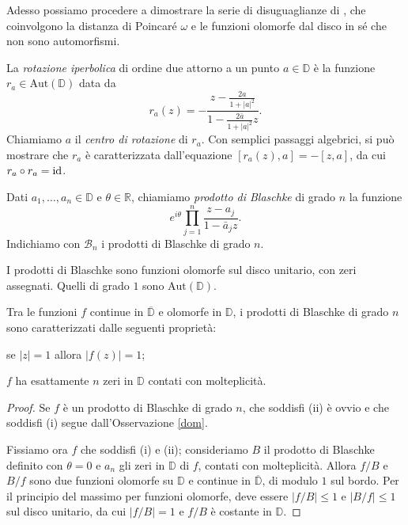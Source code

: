Adesso possiamo procedere a dimostrare la serie di disuguaglianze di \cite{BM}, che coinvolgono la distanza di Poincaré $\omega$ e le funzioni olomorfe dal disco in sé che non sono automorfismi.

\begin{defn}
  La \textit{rotazione iperbolica} di ordine due attorno a un punto $a \in \mathbb{D}$ è la funzione $r_a \in \text{Aut}(\mathbb{D})$ data da
  $$r_a(z)=-\frac{z-\frac{2a}{1+|a|^2}}{1-\frac{2\bar{a}}{1+|a|^2}z}.$$
  Chiamiamo $a$ il \textit{centro di rotazione} di $r_a$. Con semplici passaggi algebrici, si può mostrare che $r_a$ è caratterizzata dall'equazione $[r_a(z),a]=-[z,a]$, da cui $r_a\circ r_a=\operatorname{id}$.
\end{defn}

\begin{defn}
  Dati $a_1,\dots,a_n \in \mathbb{D}$ e $\theta \in \mathbb{R}$, chiamiamo \textit{prodotto di Blaschke} di grado $n$ la funzione
  $$e^{i\theta}\prod_{j=1}^n \frac{z-a_j}{1-\bar{a}_jz}.$$
  Indichiamo con $\mathcal{B}_n$ i prodotti di Blaschke di grado $n$.
\end{defn}

\begin{oss}
  I prodotti di Blaschke sono funzioni olomorfe sul disco unitario, con zeri assegnati. Quelli di grado $1$ sono $\text{Aut}(\mathbb{D})$.
\end{oss}

\begin{lm} \label{Blaschke-car}
  Tra le funzioni $f$ continue in $\overline{\mathbb{D}}$ e olomorfe in $\mathbb{D}$, i prodotti di Blaschke di grado $n$ sono caratterizzati dalle seguenti proprietà:
  \begin{nlist}
    \item se $|z|=1$ allora $|f(z)|=1$;
    \item $f$ ha esattamente $n$ zeri in $\mathbb{D}$ contati con molteplicità.
  \end{nlist}
\end{lm}

\begin{proof}
  Se $f$ è un prodotto di Blaschke di grado $n$, che soddisfi (ii) è ovvio e che soddisfi (i) segue dall'Osservazione \ref{dom}.

  Fissiamo ora $f$ che soddisfi (i) e (ii); consideriamo $B$ il prodotto di Blaschke definito con $\theta=0$ e $a_n$ gli zeri in $\mathbb{D}$ di $f$, contati con molteplicità. Allora $f/B$ e $B/f$ sono due funzioni olomorfe su $\mathbb{D}$ e continue in $\overline{\mathbb{D}}$, di modulo $1$ sul bordo. Per il principio del massimo per funzioni olomorfe, deve essere $|f/B| \le 1$ e $|B/f| \le 1$ sul disco unitario, da cui $|f/B|=1$ e $f/B$ è costante in $\mathbb{D}$.
\end{proof}


